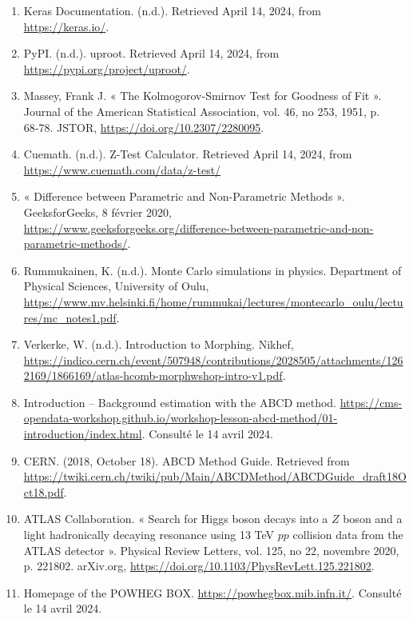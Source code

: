 \documentclass [12pt] {article}
\numberwithin{equation}{section} %
\numberwithin{figure}{section}   %
\begin{document}
\begin{enumerate}
    \item Keras Documentation. (n.d.). Retrieved April 14, 2024, from \url{https://keras.io/}. \label{keras}
    \item PyPI. (n.d.). uproot. Retrieved April 14, 2024, from \url{https://pypi.org/project/uproot/}. \label{uproot}
    \item Massey, Frank J. « The Kolmogorov-Smirnov Test for Goodness of Fit ». Journal of the American Statistical Association, vol. 46, no 253, 1951, p. 68‑78. JSTOR, \url{https://doi.org/10.2307/2280095}. \label{KS test}
    \item Cuemath. (n.d.). Z-Test Calculator. Retrieved April 14, 2024, from \url{https://www.cuemath.com/data/z-test/} \label{Z test}
    \item « Difference between Parametric and Non-Parametric Methods ». GeeksforGeeks, 8 février 2020,\\
    \url{https://www.geeksforgeeks.org/difference-between-parametric-and-non-parametric-methods/}.
    \item Rummukainen, K. (n.d.). Monte Carlo simulations in physics. Department of Physical Sciences, University of Oulu, \url{https://www.mv.helsinki.fi/home/rummukai/lectures/montecarlo_oulu/lectures/mc_notes1.pdf}. \label{Monte Carlo}
    \item Verkerke, W. (n.d.). Introduction to Morphing. Nikhef, \url{https://indico.cern.ch/event/507948/contributions/2028505/attachments/1262169/1866169/atlas-hcomb-morphwshop-intro-v1.pdf}. \label{morphing}
    \item Introduction – Background estimation with the ABCD method. \url{https://cms-opendata-workshop.github.io/workshop-lesson-abcd-method/01-introduction/index.html}. Consulté le 14 avril 2024. 
    \item CERN. (2018, October 18). ABCD Method Guide. Retrieved from \url{https://twiki.cern.ch/twiki/pub/Main/ABCDMethod/ABCDGuide_draft18Oct18.pdf}. \label{abcd}
    \item ATLAS Collaboration. « Search for Higgs boson decays into a $Z$ boson and a light hadronically decaying resonance using 13 TeV $pp$ collision data from the ATLAS detector ». Physical Review Letters, vol. 125, no 22, novembre 2020, p. 221802. arXiv.org, \url{https://doi.org/10.1103/PhysRevLett.125.221802}. \label{atlas z}
    \item Homepage of the POWHEG BOX. \url{https://powhegbox.mib.infn.it/}. Consulté le 14 avril 2024.

\end{enumerate}
\end{document}
